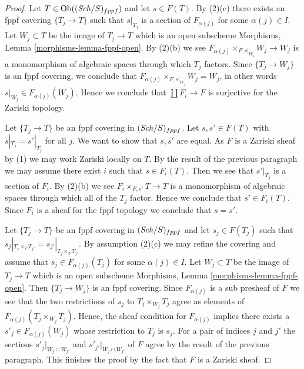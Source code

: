 \begin{proof}
Let $T \in \mathop{\mathrm{Ob}}\nolimits((\mathit{Sch}/S)_{fppf})$ and let $s \in F(T)$. By (2)(c)
there exists an fppf covering $\{T_j \to T\}$ such that
$s|_{T_j}$ is a section of $F_{\alpha(j)}$ for some $\alpha(j) \in I$.
Let $W_j \subset T$ be the image of $T_j \to T$
which is an open subscheme Morphisms, Lemma \ref{morphisms-lemma-fppf-open}.
By (2)(b) we see
$F_{\alpha(j)} \times_{F, s|_{W_j}} W_j \to W_j$ is a monomorphism
of algebraic spaces through which $T_j$ factors. Since $\{T_j \to W_j\}$
is an fppf covering, we conclude that
$F_{\alpha(j)} \times_{F, s|_{W_j}} W_j = W_j$, in other words
$s|_{W_j} \in F_{\alpha(j)}(W_j)$. Hence we conclude that
$\coprod F_i \to F$ is surjective for the Zariski topology.

\medskip\noindent
Let $\{T_j \to T\}$ be an fppf covering in $(\mathit{Sch}/S)_{fppf}$.
Let $s, s' \in F(T)$ with $s|_{T_j} = s'|_{T_j}$ for all $j$.
We want to show that $s, s'$ are equal. As $F$ is a Zariski sheaf by (1)
we may work Zariski locally on $T$. By the result of the previous paragraph
we may assume there exist $i$ such that $s \in F_i(T)$. Then we see that
$s'|_{T_j}$ is a section of $F_i$. By (2)(b) we see
$F_{i} \times_{F, s'} T \to T$ is a monomorphism of algebraic spaces
through which all of the $T_j$ factor. Hence we conclude that
$s' \in F_i(T)$. Since $F_i$ is a sheaf for the fppf topology
we conclude that $s = s'$.

\medskip\noindent
Let $\{T_j \to T\}$ be an fppf covering in $(\mathit{Sch}/S)_{fppf}$ and let
$s_j \in F(T_j)$ such that
$s_j|_{T_j \times_T T_{j'}} = s_{j'}|_{T_j \times_T T_{j'}}$. By assumption
(2)(c) we may refine the covering and assume that $s_j \in F_{\alpha(j)}(T_j)$
for some $\alpha(j) \in I$. Let $W_j \subset T$ be the image of $T_j \to T$
which is an open subscheme Morphisms, Lemma \ref{morphisms-lemma-fppf-open}.
Then $\{T_j \to W_j\}$ is an fppf covering. Since $F_{\alpha(j)}$ is a sub
presheaf of $F$ we see that the two restrictions of $s_j$ to
$T_j \times_{W_j} T_j$ agree as elements of
$F_{\alpha(j)}(T_j \times_{W_j} T_j)$. Hence, the sheaf condition for
$F_{\alpha(j)}$ implies there exists a $s'_j \in F_{\alpha(j)}(W_j)$
whose restriction to $T_j$ is $s_j$. For a pair of indices
$j$ and $j'$ the sections $s'_j|_{W_j \cap W_{j'}}$ and
$s'_{j'}|_{W_j \cap W_{j'}}$ of $F$ agree by the result of the
previous paragraph. This finishes the proof by the fact that
$F$ is a Zariski sheaf.
\end{proof}






